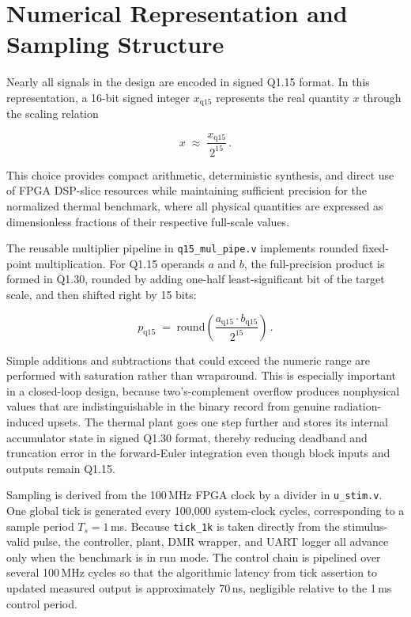 \section{Numerical Representation and Sampling Structure}
\label{sec:bench_numrep}

Nearly all signals in the design are encoded in signed Q1.15 format.
In this representation, a 16-bit signed integer $x_{\mathrm{q15}}$
represents the real quantity $x$ through the scaling relation

\begin{equation}
  x \;\approx\; \frac{x_{\mathrm{q15}}}{2^{15}} \,.
  \label{eq:q15_scaling}
\end{equation}

This choice provides compact arithmetic, deterministic synthesis, and
direct use of FPGA DSP-slice resources while maintaining sufficient
precision for the normalized thermal benchmark, where all physical
quantities are expressed as dimensionless fractions of their respective
full-scale values.

The reusable multiplier pipeline in \texttt{q15\_mul\_pipe.v} implements
rounded fixed-point multiplication.  For Q1.15 operands $a$ and $b$,
the full-precision product is formed in Q1.30, rounded by adding
one-half least-significant bit of the target scale, and then shifted
right by 15 bits:

\begin{equation}
  p_{\mathrm{q15}} \;=\; \mathrm{round}\!\left(
    \frac{a_{\mathrm{q15}} \cdot b_{\mathrm{q15}}}{2^{15}}
  \right) \,.
  \label{eq:q15_mul}
\end{equation}

Simple additions and subtractions that could exceed the numeric range
are performed with saturation rather than wraparound.  This is
especially important in a closed-loop design, because two's-complement
overflow produces nonphysical values that are indistinguishable in the
binary record from genuine radiation-induced upsets.  The thermal plant
goes one step further and stores its internal accumulator state in
signed Q1.30 format, thereby reducing deadband and truncation error in
the forward-Euler integration even though block inputs and outputs
remain Q1.15.

Sampling is derived from the 100\,MHz FPGA clock by a divider in
\texttt{u\_stim.v}.  One global tick is generated every 100,000
system-clock cycles, corresponding to a sample period $T_s = 1$\,ms.
Because \texttt{tick\_1k} is taken directly from the stimulus-valid
pulse, the controller, plant, DMR wrapper, and UART logger all advance
only when the benchmark is in run mode.  The control chain is pipelined
over several 100\,MHz cycles so that the algorithmic latency from tick
assertion to updated measured output is approximately 70\,ns, negligible
relative to the 1\,ms control period.

